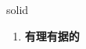 
\begin{frame}
{\huge solid}
\begin{center}
\begin{enumerate}\Large
  \item \textbf{有理有据的}
\end{enumerate}
\end{center}
\end{frame}
